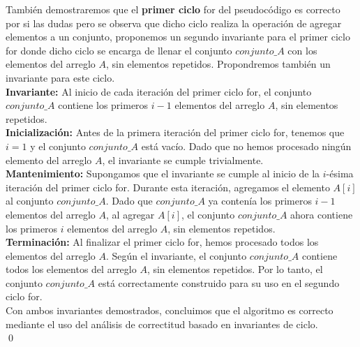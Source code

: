 \documentclass[12pt]{article}
\begin{document}
\begin{itemize}
    También demostraremos que el \textbf{primer ciclo} for del pseudocódigo es correcto por si las dudas pero se observa que dicho ciclo realiza la operación de agregar elementos a un conjunto, proponemos un segundo invariante para el primer ciclo for donde dicho ciclo se encarga de llenar el conjunto $conjunto\_A$ con los elementos del arreglo $A$, sin elementos repetidos. Propondremos también un invariante para este ciclo.\\
    \textbf{Invariante:} Al inicio de cada iteración del primer ciclo for, el conjunto $conjunto\_A$ contiene los primeros $i-1$ elementos del arreglo $A$, sin elementos repetidos.\\
    \textbf{Inicialización:} Antes de la primera iteración del primer ciclo for, tenemos que $i=1$ y el conjunto $conjunto\_A$ está vacío. Dado que no hemos procesado ningún elemento del arreglo $A$, el invariante se cumple trivialmente.\\
    \textbf{Mantenimiento:} Supongamos que el invariante se cumple al inicio de la $i$-ésima iteración del primer ciclo for. Durante esta iteración, agregamos el elemento $A[i]$ al conjunto $conjunto\_A$. Dado que $conjunto\_A$ ya contenía los primeros $i-1$ elementos del arreglo $A$, al agregar $A[i]$, el conjunto $conjunto\_A$ ahora contiene los primeros $i$ elementos del arreglo $A$, sin elementos repetidos.\\
    \textbf{Terminación:} Al finalizar el primer ciclo for, hemos procesado todos los elementos del arreglo $A$. Según el invariante, el conjunto $conjunto\_A$ contiene todos los elementos del arreglo $A$, sin elementos repetidos. Por lo tanto, el conjunto $conjunto\_A$ está correctamente construido para su uso en el segundo ciclo for.\\
    Con ambos invariantes demostrados, concluimos que el algoritmo es correcto mediante el uso del análisis de correctitud basado en invariantes de ciclo.\\
    \qed



\end{itemize}
\end{document}
